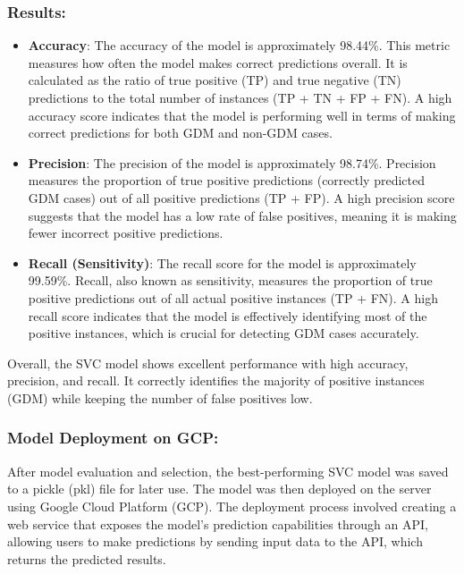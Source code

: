 \documentclass[conference,compsoc]{IEEEtran}
\begin{document}
\subsubsection{Results:}
\begin{itemize}

    \item \textbf{Accuracy}: The accuracy of the model is approximately 98.44\%. This metric measures how often the model makes correct predictions overall. It is calculated as the ratio of true positive (TP) and true negative (TN) predictions to the total number of instances (TP + TN + FP + FN). A high accuracy score indicates that the model is performing well in terms of making correct predictions for both GDM and non-GDM cases. \\

    \item \textbf{Precision}: The precision of the model is approximately 98.74\%. Precision measures the proportion of true positive predictions (correctly predicted GDM cases) out of all positive predictions (TP + FP). A high precision score suggests that the model has a low rate of false positives, meaning it is making fewer incorrect positive predictions. \\

    \item \textbf{Recall (Sensitivity)}: The recall score for the model is approximately 99.59\%. Recall, also known as sensitivity, measures the proportion of true positive predictions out of all actual positive instances (TP + FN). A high recall score indicates that the model is effectively identifying most of the positive instances, which is crucial for detecting GDM cases accurately.
\end{itemize}
Overall, the SVC model shows excellent performance with high accuracy, precision, and recall. It correctly identifies the majority of positive instances (GDM) while keeping the number of false positives low. 



\subsubsection{Model Deployment on GCP:}
After model evaluation and selection, the best-performing SVC model was saved to a pickle (pkl) file for later use. The model was then deployed on the server using Google Cloud Platform (GCP). The deployment process involved creating a web service that exposes the model's prediction capabilities through an API, allowing users to make predictions by sending input data to the API, which returns the predicted results.
\end{document}

